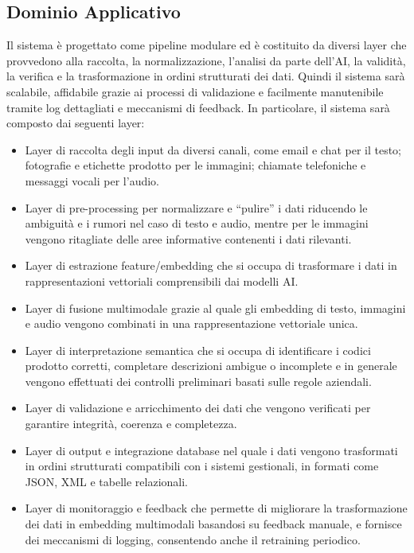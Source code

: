 \documentclass[a4paper,12pt]{article}
\begin{document}
    \subsection{Dominio Applicativo}
    Il sistema è progettato come pipeline modulare ed è costituito da diversi layer che provvedono alla raccolta, la normalizzazione, l’analisi da parte dell’AI, la validità, la verifica e la trasformazione in ordini strutturati dei dati. Quindi il sistema sarà scalabile, affidabile grazie ai processi di validazione e facilmente manutenibile tramite log dettagliati e meccanismi di feedback.
    In particolare, il sistema sarà composto dai seguenti layer:
    \begin{itemize}
		\item Layer di raccolta degli input da diversi canali, come email e chat per il testo; fotografie e etichette prodotto per le immagini; chiamate telefoniche e messaggi vocali per l’audio.
		\item Layer di pre-processing per normalizzare e “pulire” i dati riducendo le ambiguità e i rumori nel caso di testo e audio, mentre per le immagini vengono ritagliate delle aree informative contenenti i dati rilevanti.
		\item Layer di estrazione feature/embedding che si occupa di trasformare i dati in rappresentazioni vettoriali comprensibili dai modelli AI.
		\item Layer di fusione multimodale grazie al quale gli embedding di testo, immagini e audio vengono combinati in una rappresentazione vettoriale unica.
		\item Layer di interpretazione semantica che si occupa di identificare i codici prodotto corretti, completare descrizioni ambigue o incomplete e in generale vengono effettuati dei controlli preliminari basati sulle regole aziendali.
		\item Layer di validazione e arricchimento dei dati che vengono verificati per garantire integrità, coerenza e completezza.
		\item Layer di output e integrazione database nel quale i dati vengono trasformati in ordini strutturati compatibili con i sistemi gestionali, in formati come JSON, XML e tabelle relazionali.
		\item Layer di monitoraggio e feedback che permette di migliorare la trasformazione dei dati in embedding multimodali basandosi su feedback manuale, e fornisce dei meccanismi di logging, consentendo anche il retraining periodico.
    \end{itemize}
\end{document}
